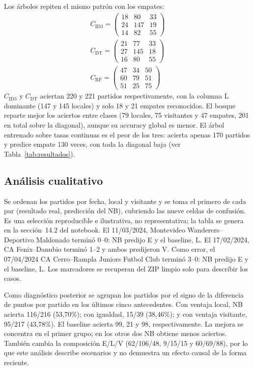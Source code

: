\documentclass[conference]{IEEEtran}
\begin{document}
Los árboles repiten el mismo patrón con los empates:
\begin{gather*}
C_{\mathrm{ID3}}=
\begin{pmatrix}18&80&33\\24&147&19\\14&82&55\end{pmatrix}
\\[4pt]
C_{\mathrm{DT}}=
\begin{pmatrix}21&77&33\\27&145&18\\16&80&55\end{pmatrix}
\\[4pt]
C_{\mathrm{RF}}=
\begin{pmatrix}47&34&50\\60&79&51\\51&25&75\end{pmatrix}
\end{gather*}
$C_{\mathrm{ID3}}$ y $C_{\mathrm{DT}}$ aciertan 220 y 221 partidos respectivamente, con la columna L dominante (147 y 145 locales) y solo 18 y 21 empates reconocidos. El bosque reparte mejor los aciertos entre clases (79 locales, 75 visitantes y 47 empates, 201 en total sobre la diagonal), aunque su accuracy global es menor. El árbol entrenado sobre tasas continuas es el peor de los tres: acierta apenas 170 partidos y predice empate 130 veces, con toda la diagonal baja (ver Tabla~\ref{tab:resultados}).

\subsection{Análisis cualitativo}
Se ordenan los partidos por fecha, local y visitante y se toma el primero de cada par (resultado real, predicción del NB), cubriendo las nueve celdas de confusión. Es una selección reproducible e ilustrativa, no representativa; la tabla se genera en la sección~14.2 del notebook. El 11/03/2024, Montevideo Wanderers--Deportivo Maldonado terminó 0--0: NB predijo E y el baseline, L. El 17/02/2024, CA Fenix--Danubio terminó 1--2 y ambos predijeron V. Como error, el 07/04/2024 CA Cerro--Rampla Juniors Futbol Club terminó 3--0: NB predijo E y el baseline, L. Los marcadores se recuperan del ZIP limpio solo para describir los casos.

Como diagnóstico posterior se agrupan los partidos por el signo de la diferencia de puntos por partido en los últimos cinco antecedentes. Con ventaja local, NB acierta 116/216 (53,70\%); con igualdad, 15/39 (38,46\%); y con ventaja visitante, 95/217 (43,78\%). El baseline acierta 99, 21 y 98, respectivamente. La mejora se concentra en el primer grupo; en los otros dos NB obtiene menos aciertos. También cambia la composición E/L/V (62/106/48, 9/15/15 y 60/69/88), por lo que este análisis describe escenarios y no demuestra un efecto causal de la forma reciente.
\end{document}
